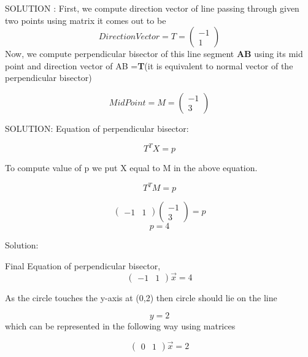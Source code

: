\documentclass{beamer}
\newcommand{\myvec}[1]{\ensuremath{\begin{pmatrix}#1\end{pmatrix}}}
\begin{document}
\begin{frame}{SOLUTION :}
First, we compute direction vector of line passing through given two points using matrix it comes out to be 
\newline 
\begin{equation}
    Direction Vector = T = \myvec{-1\\1}
\end{equation}
\newline
Now, we compute perpendicular bisector of this line segment \textbf{AB} using its mid point and direction vector of AB =\textbf{T}(it is equivalent to normal vector of the perpendicular bisector)  \newline



\begin{equation}
    Mid Point = M = \myvec{-1\\3}
\end{equation}
\end{frame}


\begin{frame}{SOLUTION:}
Equation of perpendicular bisector:\newline

\begin{equation}
    T^T X = p
\end{equation}

To compute value of p we put X equal to M in the above equation.
\newline

\begin{equation}
    T^T M = p
\end{equation}

\begin{equation}
        \myvec{-1&1}\myvec{-1\\3}=p
\end{equation}
\begin{equation}
    p=4
\end{equation}

\end{frame}

\begin{frame}{Solution: }

Final Equation of perpendicular bisector,
\begin{equation}
        \myvec{-1&1}\vec{x} = 4 
\end{equation}

As the circle touches the y-axis at (0,2) then circle should lie on the line

\begin{equation}
        y=2
\end{equation}
which can be represented in the following way using matrices

\begin{equation}
        \myvec{0&1} \vec{x} = 2
\end{equation}


\end{frame}
\end{document}

